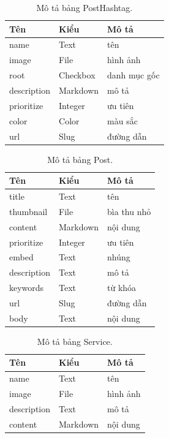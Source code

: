 \documentclass[11pt]{report}
\begin{document}
	
	\begin{table}[h!]
		\begin{center}
			\caption{Mô tả bảng PostHashtag.}
			\begin{tabular}{ |l|l|l| } 
				\hline
				Tên & Kiểu & Mô tả \\
				\hline
				name & Text & tên \\
				image & File & hình ảnh \\
				root & Checkbox & danh mục gốc \\
				description & Markdown & mô tả \\
				prioritize & Integer & ưu tiên \\
				color & Color & màu sắc \\
				url & Slug & đường dẫn \\ 
				\hline
			\end{tabular}
			\label{table:PostHashtag}
		\end{center}
	\end{table}
	
	
	\begin{table}[h!]
		\begin{center}
			\caption{Mô tả bảng Post.}
			\begin{tabular}{ |l|l|l| } 
				\hline
				Tên & Kiểu & Mô tả \\
				\hline
				title & Text & tên \\
				thumbnail & File & bìa thu nhỏ \\
				content & Markdown & nội dung \\
				prioritize & Integer & ưu tiên \\
				embed & Text & nhúng \\
				description & Text & mô tả \\
				keywords & Text & từ khóa \\
				url & Slug & đường dẫn \\
				body & Text & nội dung \\ 
				\hline
			\end{tabular}
			\label{table:Post}
		\end{center}
	\end{table}
	
	
	\begin{table}[h!]
		\begin{center}
			\caption{Mô tả bảng Service.}
			\begin{tabular}{ |l|l|l| } 
				\hline
				Tên & Kiểu & Mô tả \\
				\hline
				name & Text & tên \\
				image & File & hình ảnh \\
				description & Text & mô tả \\
				content & Markdown & nội dung \\ 
				\hline
			\end{tabular}
			\label{table:Service}
		\end{center}
	\end{table}
	
\end{document}

